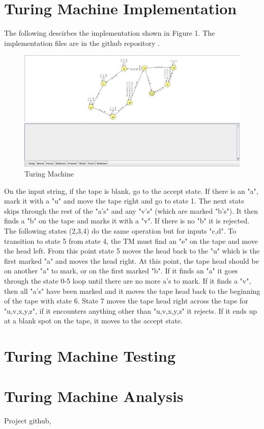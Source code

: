 \documentclass{article}
\begin{document}
\section{Turing Machine Implementation}
The following descirbes the implementation shown in Figure 1. The implementation files are in the github repository \cite{git}.\\
\begin{figure}[H]
  \includegraphics[width=\linewidth]{TuringMachine.jpg}
  \caption{Turing Machine}
  \label{fig:TM1}
\end{figure}
On the input string, if the tape is blank, go to the accept state. If there is an "a", mark it with a "u" and move the tape right and go to state 1. The next state skips through the rest of the "a's" and any "v's" (which are marked "b's"). It then finds a "b" on the tape and marks it with a "v". If there is no "b" it is rejected. The following states (2,3,4) do the same operation but for inputs "c,d". To transition to state 5 from state 4, the TM must find an "e" on the tape and move the head left. From this point state 5 moves the head back to the "u" which is the first marked "a" and moves the head right. At this point, the tape head should be on another "a" to mark, or on the first marked "b". If it finds an "a" it goes through the state 0-5 loop until there are no more a's to mark. If it finds a "v", then all "a's" have been marked and it moves the tape head back to the beginning of the tape with state 6. State 7 moves the tape head right across the tape for "u,v,x,y,z", if it encounters anything other than "u,v,x,y,z" it rejects. If it ends up at a blank spot on the tape, it moves to the accept state.\\

\section{Turing Machine Testing}

\section{Turing Machine Analysis}

\begin{thebibliography}{9}
Project github,
\\

\end{thebibliography}
\end{document}
